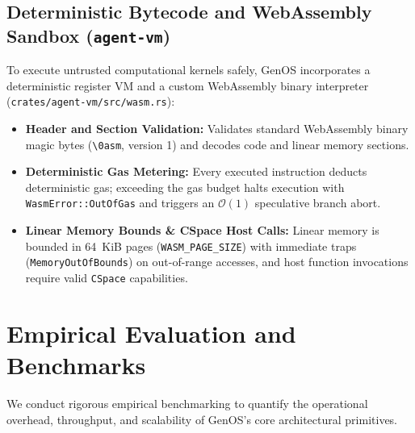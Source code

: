 \documentclass[10pt,journal,compsoc]{IEEEtran}
\theoremstyle{definition}
\begin{document}
\subsection{Deterministic Bytecode and WebAssembly Sandbox (\texttt{agent-vm})}
To execute untrusted computational kernels safely, GenOS incorporates a deterministic register VM and a custom WebAssembly binary interpreter (\texttt{crates/\allowbreak agent-vm/\allowbreak src/\allowbreak wasm.rs}):
\begin{itemize}
    \item \textbf{Header and Section Validation:} Validates standard WebAssembly binary magic bytes (\texttt{\textbackslash 0asm}, version 1) and decodes code and linear memory sections.
    \item \textbf{Deterministic Gas Metering:} Every executed instruction deducts deterministic gas; exceeding the gas budget halts execution with \texttt{WasmError::\allowbreak OutOfGas} and triggers an $\mathcal{O}(1)$ speculative branch abort.
    \item \textbf{Linear Memory Bounds \& CSpace Host Calls:} Linear memory is bounded in 64~KiB pages (\texttt{WASM\_PAGE\_SIZE}) with immediate traps (\texttt{MemoryOutOfBounds}) on out-of-range accesses, and host function invocations require valid \texttt{CSpace} capabilities.
\end{itemize}

\section{Empirical Evaluation and Benchmarks}
\label{sec:eval}

We conduct rigorous empirical benchmarking to quantify the operational overhead, throughput, and scalability of GenOS's core architectural primitives.
\end{document}
